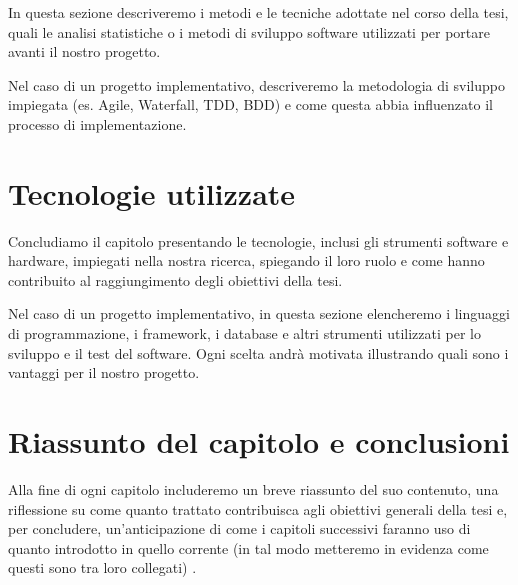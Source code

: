 In questa sezione descriveremo i metodi e le tecniche adottate nel corso della tesi, quali le analisi statistiche o i metodi di sviluppo software utilizzati per portare avanti il nostro progetto.

\medskip

Nel caso di un progetto implementativo, descriveremo la metodologia di sviluppo impiegata (es. Agile, Waterfall, TDD, BDD) e come questa abbia influenzato il processo di implementazione.

\section{Tecnologie utilizzate}

Concludiamo il capitolo presentando le tecnologie, inclusi gli strumenti software e hardware, impiegati nella nostra ricerca, spiegando il loro ruolo e come hanno contribuito al raggiungimento degli obiettivi della tesi.

\medskip

Nel caso di un progetto implementativo, in questa sezione elencheremo i linguaggi di programmazione, i framework, i database e altri strumenti utilizzati per lo sviluppo e il test del software. Ogni scelta andrà motivata illustrando quali sono i vantaggi per il nostro progetto.

\section{Riassunto del capitolo e conclusioni}

Alla fine di ogni capitolo includeremo un breve riassunto del suo contenuto, una riflessione su come quanto trattato contribuisca agli obiettivi generali della tesi e, per concludere, un'anticipazione di come i capitoli successivi faranno uso di quanto introdotto in quello corrente (in tal modo metteremo in evidenza come questi sono tra loro collegati) \cite{zobel2015writing}.